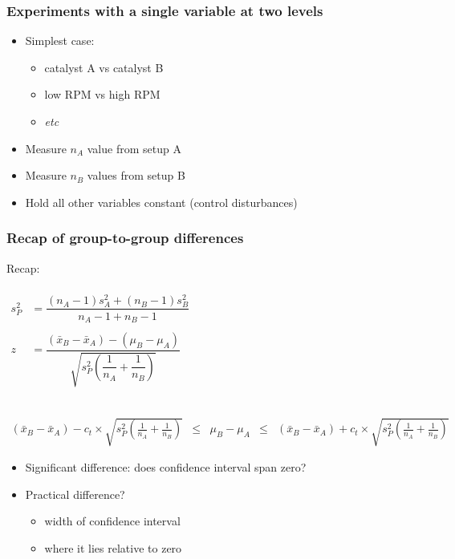 \begin{frame}\frametitle{Experiments with a single variable at two levels}
	\begin{itemize}
		\item	Simplest case:
		\begin{itemize}
			\item	catalyst A vs catalyst B
			\item	low RPM vs high RPM
			\item	\emph{etc}
		\end{itemize}
		\item	Measure $n_A$ value from setup A
		\item	Measure $n_B$ values from setup B
		\item	Hold all other variables constant (control disturbances)
	\end{itemize}
\end{frame}

\begin{frame}\frametitle{Recap of group-to-group differences}

	Recap:

	$
	\begin{array}{rcl}
		\\
		s_P^2 &= \dfrac{(n_A -1) s_A^2 + (n_B-1)s_B^2}{n_A - 1 + n_B - 1} \\
		& \\
		z &= \dfrac{(\bar{x}_B - \bar{x}_A) - (\mu_B - \mu_A)}{\sqrt{s_P^2 \left(\dfrac{1}{n_A} + \dfrac{1}{n_B}\right)}}\\
		\\
	\end{array}
	$

	$
	\begin{array}{rcccl}
		\\
		{\scriptstyle (\bar{x}_B - \bar{x}_A) - c_t} \times \sqrt{\scriptstyle s_P^2 \left(\frac{1}{n_A} + \frac{1}{n_B}\right)} &\leq& {\scriptstyle \mu_B - \mu_A} &\leq & {\scriptstyle (\bar{x}_B - \bar{x}_A) + c_t } \times \sqrt{\scriptstyle s_P^2 \left(\frac{1}{n_A} + \frac{1}{n_B}\right)}
	\end{array}
	$
	\begin{itemize}
		\item	Significant difference: does confidence interval span zero?
		\item	Practical difference?
		\begin{itemize}
			\item	width of confidence interval
			\item	where it lies relative to zero
		\end{itemize}
	\end{itemize}
\end{frame}

